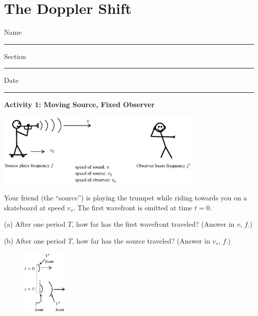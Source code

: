\section{The Doppler Shift}

Name \rule{2.0in}{0.1pt}\hfill{}Section \rule{1.0in}{0.1pt}\hfill{}Date
\rule{1.0in}{0.1pt}

\vspace{0.1in}
%


\textbf{Activity 1: Moving Source, Fixed Observer}

\begin{center}
\includegraphics[width=0.75\textwidth]{doppler_shift/moving_source.eps}
\end{center}

Your friend (the ``source'') is playing the trumpet while riding towards you on a skateboard at speed $v_s$.  The first wavefront is emitted at time $t=0$.

(a) After one period $T$, how far has the first wavefront traveled?  (Answer in $v$, $f$.)
\vspace{1.0in}

(b) After one period $T$, how far has the source traveled? (Answer in $v_s$, $f$.)
\vspace{1.0in}

\begin{figure}
    \vspace{-0.9 in}
\includegraphics[width=0.2\textwidth]{doppler_shift/front_motion.eps}
\end{figure}

